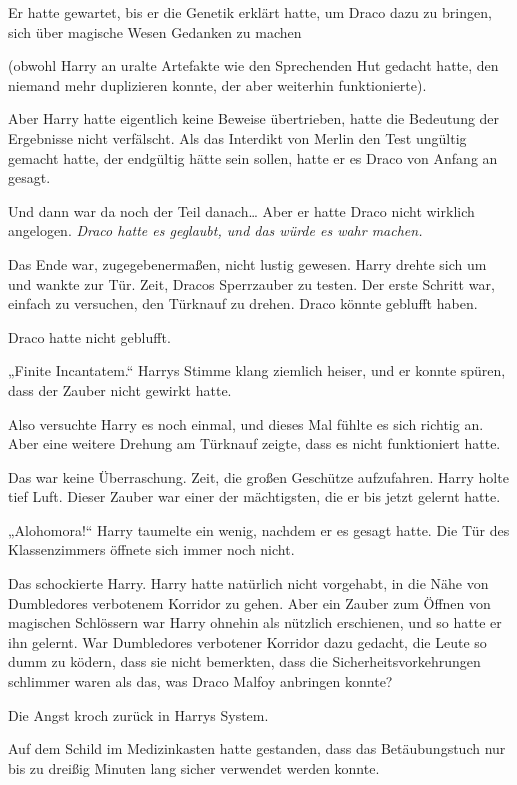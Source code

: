 {Er hatte gewartet, bis er die Genetik erklärt hatte, um Draco dazu zu bringen, sich über magische Wesen Gedanken zu machen

(obwohl Harry an uralte Artefakte wie den Sprechenden Hut gedacht hatte, den niemand mehr duplizieren konnte, der aber weiterhin funktionierte).

Aber Harry hatte eigentlich keine Beweise übertrieben, hatte die Bedeutung der Ergebnisse nicht verfälscht. Als das Interdikt von Merlin den Test ungültig gemacht hatte, der endgültig hätte sein sollen, hatte er es Draco von Anfang an gesagt.

Und dann war da noch der Teil danach… Aber er hatte Draco nicht wirklich angelogen. \emph{Draco hatte es geglaubt, und das würde es wahr machen.}

Das Ende war, zugegebenermaßen, nicht lustig gewesen. Harry drehte sich um und wankte zur Tür. Zeit, Dracos Sperrzauber zu testen. Der erste Schritt war, einfach zu versuchen, den Türknauf zu drehen. Draco könnte geblufft haben.

Draco hatte nicht geblufft.

„Finite Incantatem.“ Harrys Stimme klang ziemlich heiser, und er konnte spüren, dass der Zauber nicht gewirkt hatte.

Also versuchte Harry es noch einmal, und dieses Mal fühlte es sich richtig an. Aber eine weitere Drehung am Türknauf zeigte, dass es nicht funktioniert hatte.

Das war keine Überraschung. Zeit, die großen Geschütze aufzufahren. Harry holte tief Luft. Dieser Zauber war einer der mächtigsten, die er bis jetzt gelernt hatte.

„Alohomora!“ Harry taumelte ein wenig, nachdem er es gesagt hatte. Die Tür des Klassenzimmers öffnete sich immer noch nicht.

Das schockierte Harry. Harry hatte natürlich nicht vorgehabt, in die Nähe von Dumbledores verbotenem Korridor zu gehen. Aber ein Zauber zum Öffnen von magischen Schlössern war Harry ohnehin als nützlich erschienen, und so hatte er ihn gelernt. War Dumbledores verbotener Korridor dazu gedacht, die Leute so dumm zu ködern, dass sie nicht bemerkten, dass die Sicherheitsvorkehrungen schlimmer waren als das, was Draco Malfoy anbringen konnte?

Die Angst kroch zurück in Harrys System.

Auf dem Schild im Medizinkasten hatte gestanden, dass das Betäubungstuch nur bis zu dreißig Minuten lang sicher verwendet werden konnte.

}
